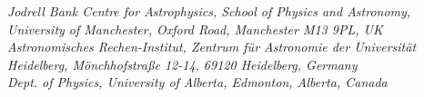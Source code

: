 {    %
    {\jodrell}{\it{Jodrell Bank Centre for Astrophysics, School of Physics and Astronomy, University of Manchester, Oxford Road, Manchester M13 9PL, UK}} \\
    {\zah}{\it{Astronomisches Rechen-Institut, Zentrum f{\"u}r Astronomie der Universit{\"a}t Heidelberg, M{\"o}nchhofstra{\ss}e 12-14, 69120 Heidelberg, Germany}}\\
    {\uofa}{\it{Dept. of Physics, University of Alberta, Edmonton, Alberta, Canada}}\\
    {}\\
    {}
    }
